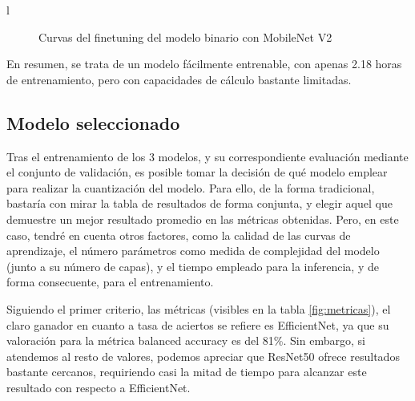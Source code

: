 l\begin{figure}[H]
	\centering
	\caption{Curvas del finetuning del modelo binario con MobileNet V2}
	\label{fig:curvasmbin}
\end{figure}

En resumen, se trata de un modelo fácilmente entrenable, con apenas 2.18 horas de entrenamiento, pero con capacidades de cálculo bastante limitadas.

\subsection{Modelo seleccionado}

Tras el entrenamiento de los 3 modelos, y su correspondiente evaluación mediante el conjunto de validación, es posible tomar la decisión de qué modelo emplear para realizar la cuantización del modelo. Para ello, de la forma tradicional, bastaría con mirar la tabla de resultados de forma conjunta, y elegir aquel que demuestre un mejor resultado promedio en las métricas obtenidas. Pero, en este caso, tendré en cuenta otros factores, como la calidad de las curvas de aprendizaje, el número parámetros como medida de complejidad del modelo (junto a su número de capas), y el tiempo empleado para la inferencia, y de forma consecuente, para el entrenamiento.

Siguiendo el primer criterio, las métricas (visibles en la tabla \ref{fig:metricas}), el claro ganador en cuanto a tasa de aciertos se refiere es EfficientNet, ya que su valoración para la métrica balanced accuracy es del 81\%. Sin embargo, si atendemos al resto de valores, podemos apreciar que ResNet50 ofrece resultados bastante cercanos,  requiriendo casi la mitad de tiempo para alcanzar este resultado con respecto a EfficientNet.


